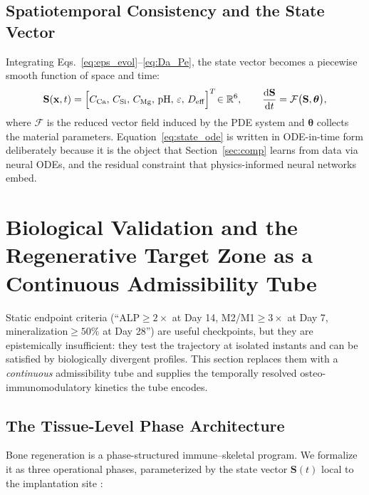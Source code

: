 \documentclass[11pt]{article}
\newcommand{\dd}{\mathrm{d}}
\begin{document}
\subsection{Spatiotemporal Consistency and the State Vector}


Integrating Eqs.~\eqref{eq:eps_evol}--\eqref{eq:Da_Pe}, the state vector becomes a piecewise smooth function of space and time:
\begin{equation}
\mathbf{S}(\mathbf{x},t)=\Bigl[C_{\mathrm{Ca}},\,C_{\mathrm{Si}},\,C_{\mathrm{Mg}},\,\mathrm{pH},\,\varepsilon,\,D_{\mathrm{eff}}\Bigr]^{T}\!\in\mathbb{R}^{6},\qquad
\frac{\dd \mathbf{S}}{\dd t}=\mathcal{F}\bigl(\mathbf{S},\boldsymbol{\theta}\bigr),
\label{eq:state_ode}
\end{equation}
where $\mathcal{F}$ is the reduced vector field induced by the PDE system and $\boldsymbol{\theta}$ collects the material parameters. Equation~\eqref{eq:state_ode} is written in ODE-in-time form deliberately because it is the object that Section~\ref{sec:comp} learns from data via neural ODEs, and the residual constraint that physics-informed neural networks embed.


\section{Biological Validation and the Regenerative Target Zone as a Continuous Admissibility Tube}
\label{sec:biology}


Static endpoint criteria (``ALP$\geq2\times$ at Day 14, M2/M1$\geq3\times$ at Day 7, mineralization$\geq50\%$ at Day 28'') are useful checkpoints, but they are epistemically insufficient: they test the trajectory at isolated instants and can be satisfied by biologically divergent profiles. This section replaces them with a \emph{continuous} admissibility tube and supplies the temporally resolved osteo-immunomodulatory kinetics the tube encodes.


\subsection{The Tissue-Level Phase Architecture}


Bone regeneration is a phase-structured immune--skeletal program. We formalize it as three operational phases, parameterized by the state vector $\mathbf{S}(t)$ local to the implantation site \cite{Tian2022,Liu2024,Miron2016}:
\end{document}

